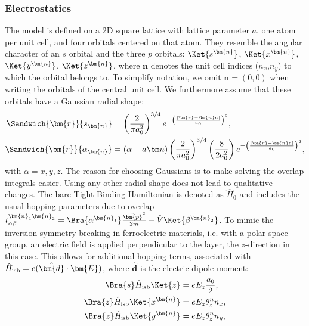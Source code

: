 \subsubsection{Electrostatics \label{sec:tb_model}}
The model is defined on a 2D square lattice with lattice parameter $a$, one atom per unit cell, and four orbitals centered on that atom.
They resemble the angular character of an $s$ orbital and the three $p$ orbitals: $\Ket{s^{\bm{n}}}$, $\Ket{x^{\bm{n}}}$, $\Ket{y^{\bm{n}}}$, $\Ket{z^{\bm{n}}}$, where $\bm{n}$ denotes the unit cell indices ($n_x$,$n_y$) to which the orbital belongs to.
To simplify notation, we omit $\bm{n} = (0, 0)$ when writing the orbitals of the central unit cell.
We furthermore assume that these orbitals have a Gaussian radial shape:
\begin{align}
	\Sandwich{\bm{r}}{s_{\bm{n}}} &= \left(\frac{2}{\pi a_0^2}\right)^{3/4}e^{-\left(\frac{|\bm{r}-\bm{n}a|}{a_0}\right)^2},\\
\Sandwich{\bm{r}}{\alpha_{\bm{n}}} &= (\alpha - a\bm n)\left(\frac{2}{\pi a_0^2}\right)^{3/4}\left(\frac{8}{2a_0^2}\right) e^{-\left(\frac{|\bm{r}-\bm{n}a|}{a_0}\right)^2},
\end{align}
with $\alpha = x, y, z$.
The reason for choosing Gaussians is to make solving the overlap integrals easier.
Using any other radial shape does not lead to qualitative changes.
The bare Tight-Binding Hamiltonian is denoted as $\hat{H}_0$ and includes the usual hopping parameters due to overlap $t_{\alpha\beta}^{\bm{n}_1\bm{n}_2} = \Bra{\alpha^{\bm{n}_1}}\frac{\hat{\bm{p}}^2}{2m} + \hat{V}\Ket{\beta^{\bm{n}_2}}$.
To mimic the inversion symmetry breaking in ferroelectric materials, i.e. with a polar space group, an electric field is applied perpendicular to the layer, the $z$-direction in this case.
This allows for additional hopping terms, associated with $\hat{H}_{\rm isb} = e (\hat{\bm{d}}\cdot \bm{E})$, where $\hat{\bm{d}}$ is the electric dipole moment:
\begin{align}
	\label{eq:dipole}
	\Bra{s} \hat{H}_{\rm isb} \Ket{z} &=  e E_z \frac{a_0}{2},\\
	\Bra{z} \hat{H}_{\rm isb} \Ket{x^{\bm{n}}} &= e E_z \theta_z^n n_x,\\
	\Bra{z} \hat{H}_{\rm isb} \Ket{y^{\bm{n}}} &= e E_z \theta_z^n n_y,
\end{align}

